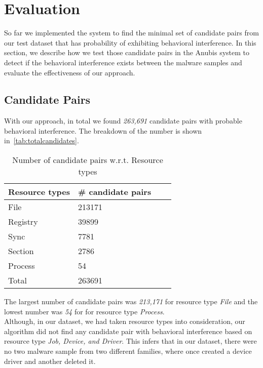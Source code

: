 \chapter{Evaluation}
\label{chapter:evaluation}
So far we implemented the system to find the minimal set of candidate pairs from our test dataset that has probability of exhibiting behavioral interference.
In this section, we describe how we test those candidate pairs in the Anubis system to detect if the behavioral interference exists between the malware samples and evaluate the effectiveness of our approach.
\section{Candidate Pairs}
\label{sec:Candidate Pairs}
With our approach, in total we found \emph{263,691} candidate pairs with probable behavioral interference.
The breakdown of the number is shown in~\autoref{tab:totalcandidates}.

\begin{table}[ht]
  \caption[Number of probable candidate pairs w.r.t. Resource types]{Number of candidate pairs w.r.t. Resource types}\label{tab:totalcandidates}
  \centering
  \begin{tabular}{l l l l}
    \toprule
    Resource types & \# candidate pairs\\
    \midrule
    File & 213171 \\
    Registry & 39899 \\
    Sync & 7781 \\
    Section & 2786 \\
    Process & 54\\
    \bottomrule
    Total & 263691\\
  \end{tabular}
\end{table}
The largest number of candidate pairs was \emph{213,171} for resource type \emph{File} and the lowest number was \emph{54} for for resource type \emph{Process}.\\
Although, in our dataset, we had taken resource types {\getresourcetypes{}} into consideration, our algorithm did not find any candidate pair with behavioral interference based on resource type \emph{Job, Device, and Driver}.
This infers that in our dataset, there were no two malware sample from two different families, where once created a device driver and another deleted it.
